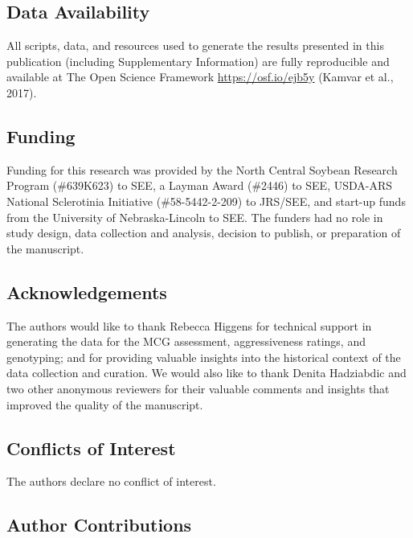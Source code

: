 \documentclass[fleqn,10pt,lineno]{wlpeerj} %
\theoremstyle{definition}
\theoremstyle{definition}
\theoremstyle{definition}
\theoremstyle{remark}
\begin{document}
\subsection*{Data Availability}\label{data-availability}

All scripts, data, and resources used to generate the results presented
in this publication (including Supplementary Information) are fully
reproducible and available at The Open Science Framework
\url{https://osf.io/ejb5y} (Kamvar et al., 2017).

\subsection*{Funding}\label{funding}

Funding for this research was provided by the North Central Soybean
Research Program (\#639K623) to SEE, a Layman Award (\#2446) to SEE,
USDA-ARS National Sclerotinia Initiative (\#58-5442-2-209) to JRS/SEE,
and start-up funds from the University of Nebraska-Lincoln to SEE. The
funders had no role in study design, data collection and analysis,
decision to publish, or preparation of the manuscript.

\subsection*{Acknowledgements}\label{acknowledgements}

The authors would like to thank Rebecca Higgens for technical support in
generating the data for the MCG assessment, aggressiveness ratings, and
genotyping; and for providing valuable insights into the historical
context of the data collection and curation. We would also like to thank
Denita Hadziabdic and two other anonymous reviewers for their valuable
comments and insights that improved the quality of the manuscript.

\subsection*{Conflicts of Interest}\label{conflicts-of-interest}

The authors declare no conflict of interest.

\subsection*{Author Contributions}\label{author-contributions}
\end{document}
